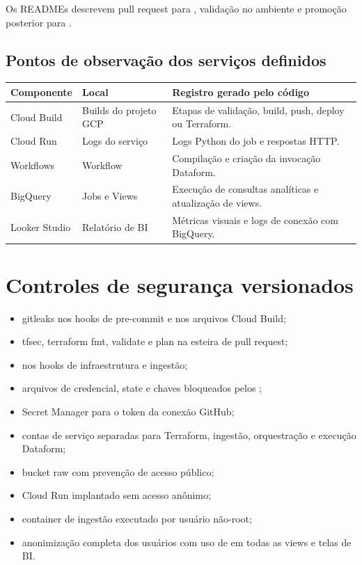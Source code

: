 \documentclass[11pt,a4paper]{article}
\begin{document}
Os READMEs descrevem pull request para , validação no ambiente e
promoção posterior para .

\subsection{Pontos de observação dos serviços definidos}

\begin{tabularx}{\textwidth}{L{36mm}L{50mm}Y}
\toprule
\textbf{Componente} & \textbf{Local} & \textbf{Registro gerado pelo código} \\
\midrule
Cloud Build & Builds do projeto GCP & Etapas de validação, build, push, deploy ou Terraform. \\
Cloud Run & Logs do serviço & Logs Python do job e respostas HTTP. \\
Workflows & Workflow  & Compilação e criação da invocação Dataform. \\
BigQuery & Jobs e Views & Execução de consultas analíticas e atualização de views. \\
Looker Studio & Relatório de BI & Métricas visuais e logs de conexão com BigQuery. \\
\bottomrule
\end{tabularx}

\section{Controles de segurança versionados}

\begin{itemize}
  \item gitleaks nos hooks de pre-commit e nos arquivos Cloud Build;
  \item tfsec, terraform fmt, validate e plan na esteira de pull request;
  \item {} nos hooks de infraestrutura e ingestão;
  \item arquivos de credencial, state e chaves bloqueados pelos ;
  \item Secret Manager para o token da conexão GitHub;
  \item contas de serviço separadas para Terraform, ingestão, orquestração e
  execução Dataform;
  \item bucket raw com prevenção de acesso público;
  \item Cloud Run implantado sem acesso anônimo;
  \item container de ingestão executado por usuário não-root;
  \item anonimização completa dos usuários com uso de  em todas as views e telas de BI.
\end{itemize}
\end{document}
